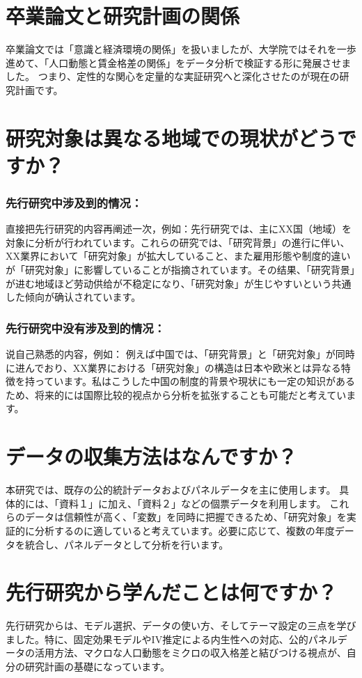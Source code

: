 \documentclass[xelatex,a4paper,base=11pt,ja=standard,jafont=noto]{bxjsreport}
\begin{document}
\section{卒業論文と研究計画の関係}
卒業論文では「意識と経済環境の関係」を扱いましたが、大学院ではそれを一歩進めて、「人口動態と賃金格差の関係」をデータ分析で検証する形に発展させました。
つまり、定性的な関心を定量的な実証研究へと深化させたのが現在の研究計画です。
\section{研究対象は異なる地域での現状がどうですか？}
\subsubsection*{先行研究中涉及到的情况：}
直接把先行研究的内容再阐述一次，例如：先行研究では、主にXX国（地域）を対象に分析が行われています。これらの研究では、「研究背景」の進行に伴い、XX業界において「研究対象」が拡大していること、また雇用形態や制度的違いが「研究対象」に影響していることが指摘されています。その结果、「研究背景」が进む地域ほど劳动供给が不稳定になり、「研究対象」が生じやすいという共通した倾向が确认されています。

\subsubsection*{先行研究中没有涉及到的情况：}
说自己熟悉的内容，例如： 例えば中国では、「研究背景」と「研究対象」が同時に进んでおり、XX業界における「研究対象」の構造は日本や欧米とは异なる特徴を持っています。私はこうした中国の制度的背景や現状にも一定の知识があるため、将来的には国際比较的视点から分析を拡张することも可能だと考えています。
\section{データの収集方法はなんですか？}
本研究では、既存の公的統計データおよびパネルデータを主に使用します。
具体的には、「資料１」に加え、「資料２」などの個票データを利用します。
これらのデータは信頼性が高く、「変数」を同時に把握できるため、「研究対象」を実証的に分析するのに適していると考えています。必要に応じて、複数の年度データを統合し、パネルデータとして分析を行います。
\section{先行研究から学んだことは何ですか？}
先行研究からは、モデル選択、データの使い方、そしてテーマ設定の三点を学びました。特に、固定効果モデルやIV推定による内生性への対応、公的パネルデータの活用方法、マクロな人口動態をミクロの収入格差と結びつける視点が、自分の研究計画の基礎になっています。
\end{document}
